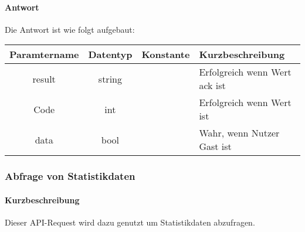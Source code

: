 \paragraph{Antwort}Die Antwort ist wie folgt aufgebaut:
\begin{table}[H]
	\begin{tabular}{|c|c|c|p{6.5cm}|}
		\hline
		\textbf{Paramtername} & \textbf{Datentyp} & \textbf{Konstante} & \textbf{Kurzbeschreibung}                                                                                               \\ \hline
		result              & string           &                 & Erfolgreich wenn Wert {\glqq ack\grqq} ist \\ \hline
		Code                & int              &                 & Erfolgreich wenn Wert {\glqq 0\grqq} ist \\ \hline
		data                & bool             &                 & Wahr, wenn Nutzer Gast ist \\ \hline
	\end{tabular}
\end{table}
\subsubsection{Abfrage von Statistikdaten}
\paragraph{Kurzbeschreibung}Dieser API-Request wird dazu genutzt um Statistikdaten abzufragen.
